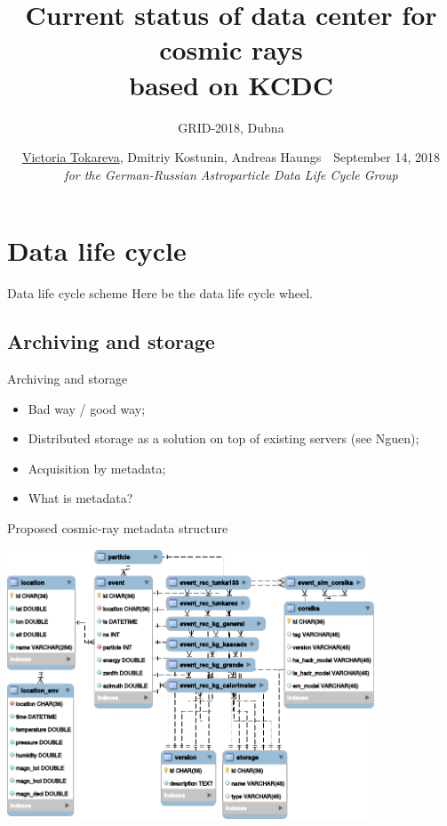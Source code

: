 \documentclass[18pt]{beamer}
\title[Cosmic rays data center based on KCDC]{Current status of data center for cosmic rays \\based on KCDC}
\subtitle{GRID-2018, Dubna}
\author[\underline{Victoria Tokareva}, Dmitriy Kostunin, Andreas Haungs]{
  \underline{Victoria Tokareva}, Dmitriy Kostunin, Andreas Haungs~\textbar~September 14, 2018
  \\ \textit{for the German-Russian Astroparticle Data Life Cycle Group}
}
\institute{Institute for Nuclear Physics (IKP)}
\begin{document}



\section{Data life cycle}

\begin{frame}{Data life cycle scheme}
\Huge Here be the data life cycle wheel.
\end{frame}

\subsection{Archiving and storage}

\begin{frame}{Archiving and storage}
\begin{itemize}
\item Bad way / good way;
\item Distributed storage as a solution on top of existing servers (see Nguen);
\item Acquisition by metadata;
\item What is metadata?
\end{itemize}
\end{frame}

\begin{frame}{Proposed cosmic-ray metadata structure}
\vspace{-1.5em}
\begin{center}
\includegraphics[width=0.82\textwidth]{pics/metadata.pdf}
\end{center}
\end{frame}
\end{document}
